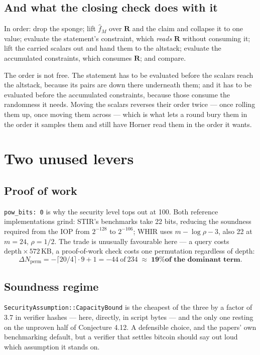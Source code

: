 \documentclass[11pt,a4paper]{article}
\begin{document}
\subsection*{And what the closing check does with it}

In order: drop the sponge; lift $\hat f_{M}$ over $\boldsymbol R$ and the claim and collapse it to one
value; evaluate the statement's constraint, which \emph{reads} $\boldsymbol R$ without consuming it;
lift the carried scalars out and hand them to the altstack; evaluate the accumulated constraints,
which consumes $\boldsymbol R$; and compare.

The order is not free. The statement has to be evaluated before the scalars reach the altstack,
because its pairs are down there underneath them; and it has to be evaluated before the accumulated
constraints, because those consume the randomness it needs. Moving the scalars reverses their order
twice --- once rolling them up, once moving them across --- which is what lets a round bury them in
the order it samples them and still have Horner read them in the order it wants.

\section{Two unused levers}\label{sec:levers}

\subsection*{Proof of work}
\texttt{pow\_bits: 0} is why the security level tops out at 100. Both reference implementations
grind: STIR's benchmarks take 22 bits, reducing the soundness required from the IOP from $2^{-128}$
to $2^{-106}$; WHIR uses $m-\log\rho-3$, also 22 at $m=24$, $\rho=1/2$. The trade is unusually
favourable here --- a query costs $\mathrm{depth}\times572$\,KB, a proof-of-work check costs one
permutation regardless of depth:
\[
  \Delta N_{\mathrm{perm}} = -\lceil20/4\rceil\cdot9 + 1 = -44 \ \text{of}\ 234
  \;\approx\; \textbf{19\% of the dominant term}.
\]

\subsection*{Soundness regime}
\texttt{SecurityAssumption::CapacityBound} is the cheapest of the three by a factor of 3.7 in
verifier hashes --- here, directly, in script bytes --- and the only one resting on the unproven half
of Conjecture 4.12. A defensible choice, and the papers' own benchmarking default, but a verifier
that settles bitcoin should say out loud which assumption it stands on.
\end{document}
